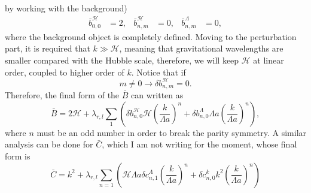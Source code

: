 \documentclass{article}
\begin{document}
by working with the background)
\begin{align}
    \bar{b}^{\mathcal{H}}_{0,0} & = 2, & \bar{b}^{\mathcal{H}}_{n,m} & = 0, & 
    \bar{b}^{\Lambda}_{n,m} & = 0, 
\end{align}
where the background object is completely defined. Moving to the perturbation part, it is required
that $k \gg \mathcal{H}$, meaning that gravitational wavelengths are smaller compared with the Hubble
scale, therefore, we will keep $\mathcal{H}$ at linear order, coupled to higher order of $k$. Notice that
if 
\begin{equation}
    m \neq 0 \to \delta b^{\mathcal{H}}_{n,m} = 0.
\end{equation}
Therefore, the final form of the $\bar{B}$ can written as
\begin{equation}
    \bar{B} = 2\mathcal{H} + \lambda_{r,l}\sum_{1}
    \left(\delta b^{\mathcal{H}}_{n,0}\mathcal{H} \left(\frac{k}{\Lambda a}\right)^n 
    + \delta b^{\Lambda}_{n,0}\Lambda a \left(\frac{k}{\Lambda a}\right)^n\right),
\end{equation}
where $n$ must be an odd number in order to break the parity symmetry. A similar analysis can be done for 
$\bar{C}$, which I am not writing for the moment, whose final form is
\begin{equation}
    \bar{C} = k^2 + \lambda_{r,l} \sum_{n=1}\left(
        \mathcal{H}\Lambda a \delta c^{\Lambda}_{n,1}\left(\frac{k}{\Lambda a}\right)^n
        + \delta c^{k}_{n,0}k^2 \left(\frac{k}{\Lambda a}\right)^n
    \right)
\end{equation}
\end{document}
